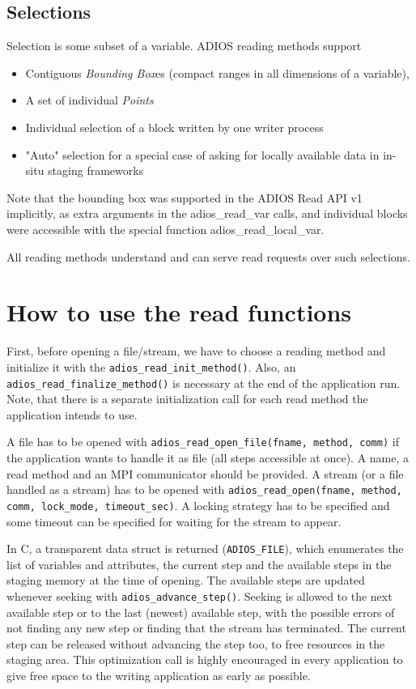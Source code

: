 \subsection{Selections}
Selection is some subset of a variable. ADIOS reading methods support 

\begin{itemize}
    \item Contiguous {\em Bounding Box}es (compact ranges in all dimensions of a variable), 
     \item A set of individual {\em Points}
    \item Individual selection of a block written by one writer process
         \item "Auto" selection for a special case of asking for locally available data in in-situ staging frameworks
\end{itemize}

\noindent Note that the bounding box was supported in the ADIOS Read API v1 implicitly, as extra arguments in the adios\_read\_var calls, and individual blocks were accessible with the special function adios\_read\_local\_var. 

All reading methods understand and can serve read requests over such selections.  

\section{How to use the read functions}
First, before opening a file/stream, we have to choose a reading method and initialize it with the \linebreak \verb+adios_read_init_method()+. Also, an \verb+adios_read_finalize_method()+ is necessary at the end of the application run. Note, that there is a separate initialization call for each read method the application intends to use.

A file has to be opened with \verb+adios_read_open_file(fname, method, comm)+ if the application wants to handle it as file (all steps accessible at once). A name, a read method and an MPI communicator should be provided. A stream (or a file handled as a stream) has to be opened with \linebreak
\verb+adios_read_open(fname, method, comm, lock_mode, timeout_sec)+.  A locking strategy has to be specified and some timeout can be specified for waiting for the stream to appear.  

In C, a transparent data struct is returned (\verb+ADIOS_FILE+), which enumerates the list of variables and attributes,  the current step and the available steps in the staging memory at the time of opening. The available steps are updated whenever seeking with \verb+adios_advance_step()+. Seeking is allowed to the next available step or to the last (newest) available step, with the possible errors of not finding any new step or finding that the stream has terminated. The current step can be released without advancing the step too, to free resources in the staging area. This optimization call is highly encouraged in every application to give free space to the writing application as early as possible. 

